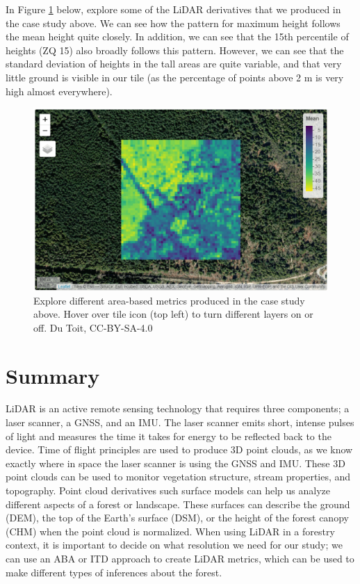 \documentclass[
]{book}
\begin{document}
In Figure \ref{fig:15-map} below, explore some of the LiDAR derivatives that we produced in the case study above. We can see how the pattern for maximum height follows the mean height quite closely. In addition, we can see that the 15th percentile of heights (ZQ 15) also broadly follows this pattern. However, we can see that the standard deviation of heights in the tall areas are quite variable, and that very little ground is visible in our tile (as the percentage of points above 2 m is very high almost everywhere).

\begin{figure}
\includegraphics[width=14.03in]{images/15-map} \caption{Explore different area-based metrics produced in the case study above. Hover over tile icon (top left) to turn different layers on or off. Du Toit, CC-BY-SA-4.0}\label{fig:15-map}
\end{figure}

\section{Summary}\label{summary-5}

LiDAR is an active remote sensing technology that requires three components; a laser scanner, a GNSS, and an IMU. The laser scanner emits short, intense pulses of light and measures the time it takes for energy to be reflected back to the device. Time of flight principles are used to produce 3D point clouds, as we know exactly where in space the laser scanner is using the GNSS and IMU. These 3D point clouds can be used to monitor vegetation structure, stream properties, and topography. Point cloud derivatives such surface models can help us analyze different aspects of a forest or landscape. These surfaces can describe the ground (DEM), the top of the Earth's surface (DSM), or the height of the forest canopy (CHM) when the point cloud is normalized. When using LiDAR in a forestry context, it is important to decide on what resolution we need for our study; we can use an ABA or ITD approach to create LiDAR metrics, which can be used to make different types of inferences about the forest.
\end{document}
